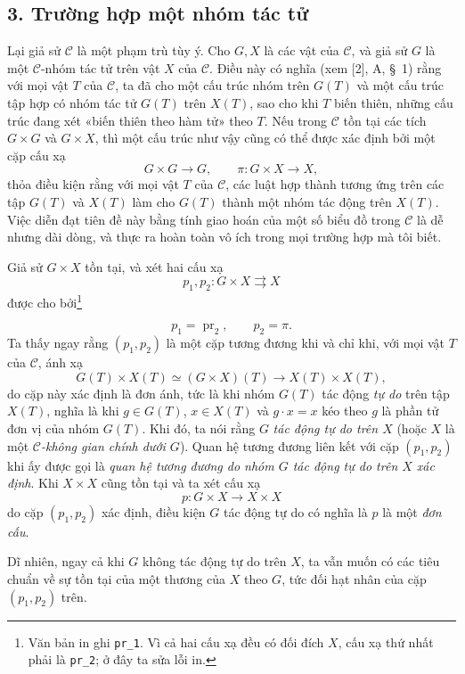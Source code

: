 \subsection*{3. Trường hợp một nhóm tác tử}

Lại giả sử $\mathcal C$ là một phạm trù tùy ý. Cho $G,X$ là các vật của
$\mathcal C$, và giả sử $G$ là một $\mathcal C$-nhóm tác tử trên vật $X$ của
$\mathcal C$. Điều này có nghĩa (xem [2], A, \S~1) rằng với mọi vật $T$ của
$\mathcal C$, ta đã cho một cấu trúc nhóm trên $G(T)$ và một cấu trúc tập hợp
có nhóm tác tử $G(T)$ trên $X(T)$, sao cho khi $T$ biến thiên, những cấu trúc
đang xét «biến thiên theo hàm tử» theo $T$. Nếu trong $\mathcal C$ tồn tại các
tích $G\times G$ và $G\times X$, thì một cấu trúc như vậy cũng có thể được
xác định bởi một cặp cấu xạ
\[
  G\times G\longrightarrow G,
  \qquad \pi:G\times X\longrightarrow X,
\]
thỏa điều kiện rằng với mọi vật $T$ của $\mathcal C$, các luật hợp thành tương
ứng trên các tập $G(T)$ và $X(T)$ làm cho $G(T)$ thành một nhóm tác động trên
$X(T)$. Việc diễn đạt tiên đề này bằng tính giao hoán của một số biểu đồ trong
$\mathcal C$ là dễ nhưng dài dòng, và thực ra hoàn toàn vô ích trong mọi
trường hợp mà tôi biết.

Giả sử $G\times X$ tồn tại, và xét hai cấu xạ
\[
  p_1,p_2:G\times X\rightrightarrows X
\]
được cho bởi\footnote{Văn bản in ghi \texttt{pr\_1}. Vì cả hai cấu xạ đều có
đối đích $X$, cấu xạ thứ nhất phải là \texttt{pr\_2}; ở đây ta sửa lỗi in.}

\[
  p_1=\operatorname{pr}_2,\qquad p_2=\pi.
\]
Ta thấy ngay rằng $(p_1,p_2)$ là một cặp tương đương khi và chỉ khi, với mọi
vật $T$ của $\mathcal C$, ánh xạ
\[
  G(T)\times X(T)\simeq(G\times X)(T)
  \longrightarrow X(T)\times X(T),
\]
do cặp này xác định là đơn ánh, tức là khi nhóm $G(T)$ tác động
\emph{tự do} trên tập $X(T)$, nghĩa là khi $g\in G(T)$, $x\in X(T)$ và
$g\cdot x=x$ kéo theo $g$ là phần tử đơn vị của nhóm $G(T)$. Khi đó, ta nói
rằng $G$ \emph{tác động tự do trên $X$} (hoặc $X$ là một
\emph{$\mathcal C$-không gian chính dưới $G$}). Quan hệ tương đương liên kết
với cặp $(p_1,p_2)$ khi ấy được gọi là \emph{quan hệ tương đương do nhóm $G$
tác động tự do trên $X$ xác định}. Khi $X\times X$ cũng tồn tại và ta xét cấu
xạ
\[
  p:G\times X\longrightarrow X\times X
\]
do cặp $(p_1,p_2)$ xác định, điều kiện $G$ tác động tự do có nghĩa là $p$ là
một \emph{đơn cấu}.

Dĩ nhiên, ngay cả khi $G$ không tác động tự do trên $X$, ta vẫn muốn có các
tiêu chuẩn về sự tồn tại của một thương của $X$ theo $G$, tức đối hạt nhân của
cặp $(p_1,p_2)$ trên.

